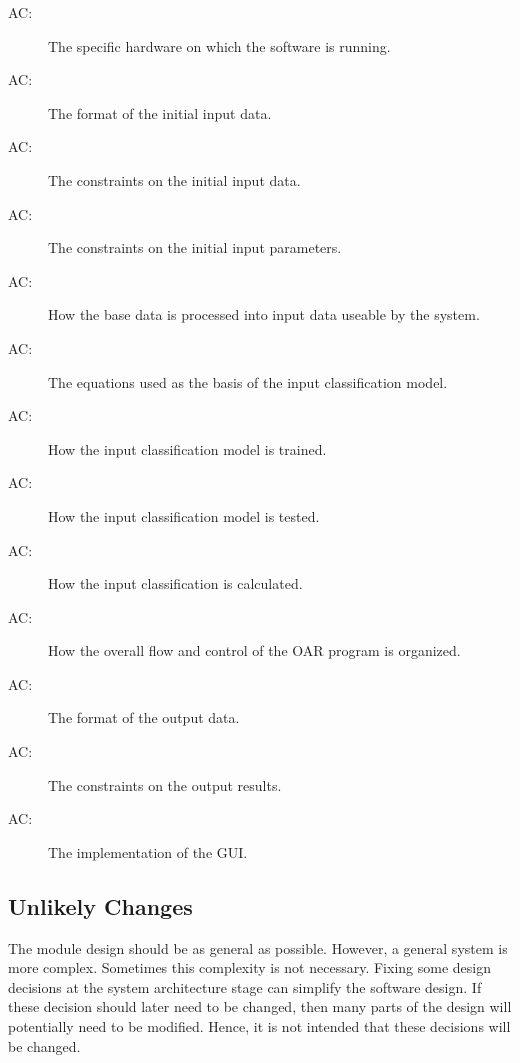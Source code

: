 \documentclass[12pt, titlepage]{article}
\newcounter{acnum}
\newcommand{\actheacnum}{AC\theacnum}
\begin{document}
\begin{description}
\item[ \actheacnum \label{acHardware}:] The specific
  hardware on which the software is running.
\item[ \actheacnum \label{acInput}:] The format of the
  initial input data.
\item[ \actheacnum \label{acInput2}:] The constraints on the initial input data.
\item[ \actheacnum \label{acInputParams}:] The constraints on the
initial input parameters.
\item[ \actheacnum \label{acPreprocess}:] How the base data is processed into input data useable by the system.
\item[ \actheacnum \label{acModel}:] The equations used as the basis of the input classification model.
\item[ \actheacnum \label{acTrain}:] How the input classification model is trained.
\item[ \actheacnum \label{acTest}:] How the input classification model is tested.
\item[ \actheacnum \label{acCalc}:] How the input classification is calculated.
\item[ \actheacnum \label{acFlow}:] How the overall flow and control of the OAR program is organized.
\item[ \actheacnum \label{acOutput}:] The format of the
  output data.
\item[ \actheacnum \label{acOutput2}:] The constraints on the output results.
\item[ \actheacnum \label{acGui}:] The implementation of the GUI.
\end{description}

\subsection{Unlikely Changes} \label{SecUchange}

The module design should be as general as possible. However, a general system is
more complex. Sometimes this complexity is not necessary. Fixing some design
decisions at the system architecture stage can simplify the software design. If
these decision should later need to be changed, then many parts of the design
will potentially need to be modified. Hence, it is not intended that these
decisions will be changed.
\end{document}
